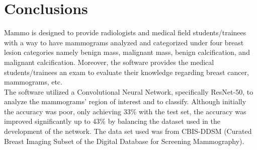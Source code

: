 \section{Conclusions}
\qquad Mammo is designed to provide radiologists and medical field students/trainees with a way to have mammograms analyzed and categorized under four breast lesion categories namely benign mass, malignant mass, benign calcification, and malignant calcification. Moreover, the software provides the medical students/trainees an exam to evaluate their knowledge regarding breast cancer, mammograms, etc. \\
	
	The software utilized a Convolutional Neural Network, specifically ResNet-50, to analyze the mammograms' region of interest and to classify. Although initially the accuracy was poor, only achieving 33\% with the test set, the accuracy was improved significantly up to 43\% by balancing the dataset used in the development of the network. The data set used was from CBIS-DDSM (Curated Breast Imaging Subset of the Digital Database for Screening Mammography).

\clearpage